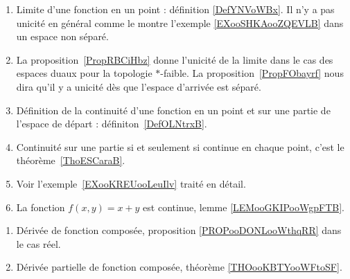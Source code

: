 \begin{enumerate}
    \item
        Limite d'une fonction en un point : définition \ref{DefYNVoWBx}. Il n'y a pas unicité en général comme le montre l'exemple \ref{EXooSHKAooZQEVLB} dans un espace non séparé.
    \item
        La proposition~\ref{PropRBCiHbz} donne l'unicité de la limite dans le cas des espaces duaux pour la topologie \( *\)-faible. La proposition~\ref{PropFObayrf} nous dira qu'il y a unicité dès que l'espace d'arrivée est séparé.
    \item
        Définition de la continuité d'une fonction en un point et sur une partie de l'espace de départ : définiton~\ref{DefOLNtrxB}.
    \item
        Continuité sur une partie si et seulement si continue en chaque point, c'est le théorème~\ref{ThoESCaraB}.
    \item
        Voir l'exemple~\ref{EXooKREUooLeuIlv} traité en détail.
    \item
        La fonction \( f(x,y)=x+y\) est continue, lemme \ref{LEMooGKIPooWgpFTB}.
\end{enumerate}

\begin{enumerate}
    \item
        Dérivée de fonction composée, proposition \ref{PROPooDONLooWthqRR} dans le cas réel.
    \item
        Dérivée partielle de fonction composée, théorème \ref{THOooKBTYooWFtoSF}.
\end{enumerate}

